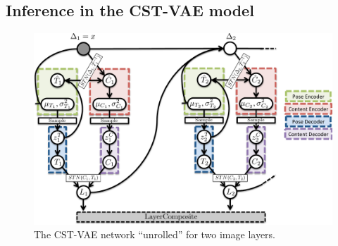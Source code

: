   
 
 
 


\subsection{Inference in the CST-VAE model}
\label{sec:cstvae}
\vspace{-3mm}

\begin{figure}[t]
\begin{center}
\includegraphics[width=0.65\linewidth]{figs/cstvae_diagram.pdf}\vspace{-4mm}
\end{center}
 \caption{\footnotesize
The CST-VAE network ``unrolled'' for two image layers.
 }\vspace{-4mm}
\label{fig:cstvae}
\end{figure}


